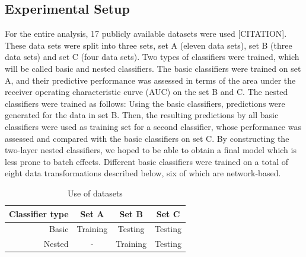 \documentclass[10pt,conference,compsocconf]{IEEEtran}
\begin{document}
\subsection{Experimental Setup}
For the entire analysis, 17 publicly available datasets were used [CITATION]. These data sets were split into three sets, set A (eleven data sets), set B (three data sets) and set C (four data sets). Two types of classifiers were trained, which will be called basic and nested classifiers. The basic classifiers were trained on set A, and their predictive performance was assessed in terms of the area under the receiver operating characteristic curve (AUC) on the set B and C. The nested classifiers were trained as follows: Using the basic classifiers, predictions were generated for the data in set B. Then, the resulting predictions by all basic classifiers were used as training set for a second classifier, whose performance was assessed and compared with the basic classifiers on set C. By constructing the two-layer nested classifiers, we hoped to be able to obtain a final model which is less prone to batch effects. 
Different basic classifiers were trained on a total of eight data transformations described below, six of which are network-based. 
\begin{table}[H]
	\centering
	\begin{tabular}{|r|c|c|c|}
	\hline
	\textbf{Classifier type} & \textbf{Set A} & \textbf{Set B} & \textbf{Set C} \\ \hline
	Basic & Training & Testing & Testing \\
	Nested & - & Training & Testing \\
	\hline
	\end{tabular}
	\caption{Use of datasets}
\end{table}
\end{document}
